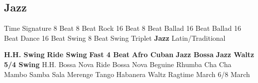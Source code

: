 \subsection{Jazz}
Time Signature
8 Beat
8 Beat Rock
16 Beat
8 Beat Ballad
16 Beat Ballad
16 Beat Dance
16 Beat Swing
8 Beat Swing
Triplet
\textbf{Jazz}
Latin/Traditional





























\textbf{H.H. Swing}
\textbf{Ride Swing}
\textbf{Fast 4 Beat}
\textbf{Afro Cuban}
\textbf{Jazz Bossa}
\textbf{Jazz Waltz}
\textbf{5/4 Swing}
H.H. Bossa Nova
Ride Bossa Nova
Beguine
Rhumba
Cha Cha
Mambo
Samba
Sala
Merenge
Tango
Habanera
Waltz
Ragtime
March
6/8 March
